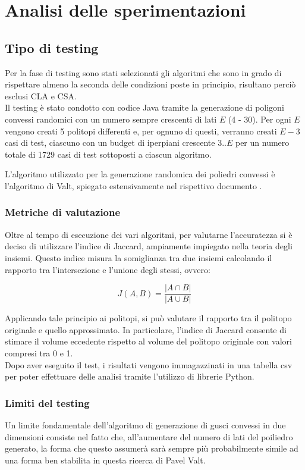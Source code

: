 \chapter{Analisi delle sperimentazioni}
\section{Tipo di testing}
Per la fase di testing sono stati selezionati gli algoritmi che sono in grado di rispettare
almeno la seconda delle condizioni poste in principio, risultano perciò esclusi CLA e CSA.\\

Il testing è stato condotto con codice Java tramite la generazione di poligoni convessi
randomici con un numero sempre crescenti di lati $E$ (4 - 30). 
Per ogni $E$ vengono creati 5 politopi differenti e, per ognuno di questi, verranno creati
$E-3$ casi di test, ciascuno con un budget di iperpiani crescente $3 .. E$
per un numero totale di 1729 casi di test sottoposti a ciascun algoritmo.

L'algoritmo utilizzato per la generazione randomica dei poliedri convessi 
è l'algoritmo di Valt, spiegato estensivamente nel rispettivo documento
\cite{ValtrAlgorithm}.

\subsection*{Metriche di valutazione}
Oltre al tempo di esecuzione dei vari algoritmi, per valutarne l'accuratezza si è deciso
di utilizzare l'indice di Jaccard, ampiamente impiegato nella teoria degli insiemi. 
Questo indice misura la somiglianza tra due insiemi calcolando il rapporto tra 
l'intersezione e l'unione degli stessi, ovvero:
 
\[
J(A, B) = \frac{|A \cap B|}{|A \cup B|}
\]

Applicando tale principio ai politopi, si può valutare il rapporto tra il politopo originale 
e quello approssimato. In particolare, l'indice di Jaccard consente di stimare il volume 
eccedente rispetto al volume del politopo originale con valori compresi tra 0 e 1.\\

Dopo aver eseguito il test, i risultati vengono immagazzinati in una tabella csv per poter 
effettuare delle analisi tramite l'utilizzo di librerie Python.


\subsection*{Limiti del testing}
Un limite fondamentale dell'algoritmo di generazione di gusci convessi in due dimensioni 
consiste nel fatto che, all'aumentare del numero di lati del poiliedro generato, 
la forma che questo assumerà sarà sempre più probabilmente simile ad una forma
ben stabilita in questa ricerca di Pavel Valt.\cite{probabilityConvexhull2d}

